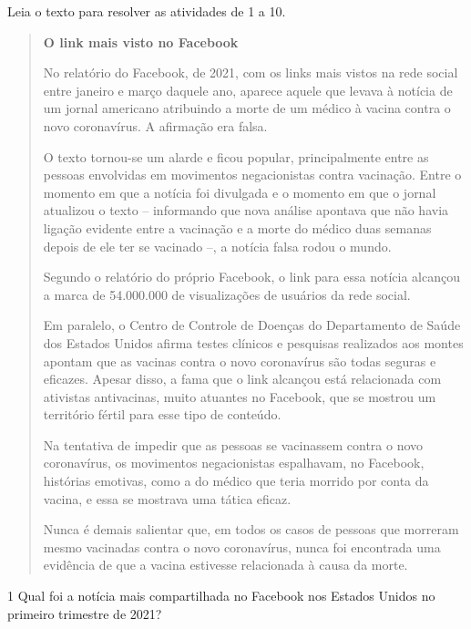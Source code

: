 
Leia o texto para resolver as atividades de 1 a 10.

\begin{quote}
\textbf{O link mais visto no Facebook}

No relatório do Facebook, de 2021, com os links mais vistos na rede social
entre janeiro e março daquele ano, aparece aquele que levava à notícia
de um jornal americano atribuindo a morte de um médico à vacina contra
o novo coronavírus. A afirmação era falsa.

O texto tornou-se um alarde e ficou popular, principalmente entre as pessoas
envolvidas em movimentos negacionistas contra vacinação. Entre o momento em
que a notícia foi divulgada e o momento em que o jornal atualizou o texto --
informando que nova análise apontava que não havia ligação evidente entre a
vacinação e a morte do médico duas semanas depois de ele ter se vacinado --,
a notícia falsa rodou o mundo.

Segundo o relatório do próprio Facebook, o link para essa notícia alcançou
a marca de 54.000.000 de visualizações de usuários da rede social.

Em paralelo, o Centro de Controle de Doenças do Departamento de Saúde dos Estados
Unidos afirma testes clínicos e pesquisas realizados aos montes apontam que as
vacinas contra o novo coronavírus são todas seguras e eficazes. Apesar disso, a
fama que o link alcançou está relacionada com ativistas antivacinas, muito atuantes
no Facebook, que se mostrou um território fértil para esse tipo de conteúdo.

Na tentativa de impedir que as pessoas se vacinassem contra o novo coronavírus,
os movimentos negacionistas espalhavam, no Facebook, histórias emotivas, como
a do médico que teria morrido por conta da vacina, e essa se mostrava uma
tática eficaz.

Nunca é demais salientar que, em todos os casos de pessoas que morreram
mesmo vacinadas contra o novo coronavírus, nunca foi encontrada uma evidência
de que a vacina estivesse relacionada à causa da morte.

\end{quote}


\num{1} Qual foi a notícia mais compartilhada no Facebook nos Estados
Unidos no primeiro trimestre de 2021?

